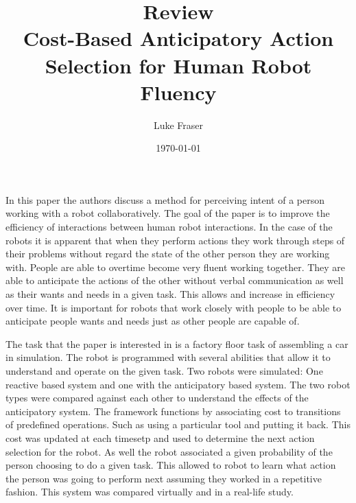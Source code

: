 \documentclass{article}
\begin{document}
\title{{\large Review} \\ Cost-Based Anticipatory Action Selection for Human Robot Fluency}
\author{Luke Fraser}
\date{\today}
\maketitle

\begingroup
\renewcommand{\section}[2]{}


\endgroup

\section*{Summary}
In this paper the authors discuss a method for perceiving intent of a person working with a robot collaboratively. The goal of the paper is to improve the efficiency of interactions between human robot interactions. In the case of the robots it is apparent that when they perform actions they work through steps of their problems without regard the state of the other person they are working with. People are able to overtime become very fluent working together. They are able to anticipate the actions of the other without verbal communication as well as their wants and needs in a given task. This allows and increase in efficiency over time. It is important for robots that work closely with people to be able to anticipate people wants and needs just as other people are capable of.

The task that the paper is interested in is a factory floor task of assembling a car in simulation. The robot is programmed with several abilities that allow it to understand and operate on the given task. Two robots were simulated: One reactive based system and one with the anticipatory based system. The two robot types were compared against each other to understand the effects of the anticipatory system. The framework functions by associating cost to transitions of predefined operations. Such as using a particular tool and putting it back. This cost was updated at each timesetp and used to determine the next action selection for the robot. As well the robot associated a given probability of the person choosing to do a given task. This allowed to robot to learn what action the person was going to perform next assuming they worked in a repetitive fashion. This system was compared virtually and in a real-life study.
\end{document}
